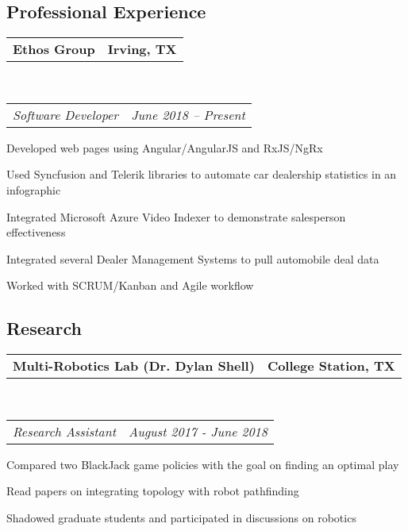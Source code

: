 \documentclass[10pt,letterpaper]{article}
\makeatletter
\newenvironment{indentsection}[1]%
{\begin{list}{}%
	{\setlength{\leftmargin}{#1}}%
	\item[]%
}
{\end{list}}
\newcommand{\headerrow}[2]
{\begin{tabular*}{\linewidth}{l@{\extracolsep{\fill}}r}
	#1 &
	#2 \\
\end{tabular*}}
\makeatother
\begin{document}
\subsection*{Professional Experience}
\begin{indentsection}{\parindent}
	\vspace{-0.4em}
	\headerrow
		{\textbf{Ethos Group}}
		{\textbf{Irving, TX}}
	\\
	\headerrow
		{\emph{Software Developer}}
		{\emph{June 2018 -- Present}}
	\begin{itemize*}
		\item Developed web pages using Angular/AngularJS and RxJS/NgRx
		\item Used Syncfusion and Telerik libraries to automate car dealership statistics in an infographic
		\item Integrated Microsoft Azure Video Indexer to demonstrate salesperson effectiveness 
		\item Integrated several Dealer Management Systems to pull automobile deal data
		\item Worked with SCRUM/Kanban and Agile workflow
	\end{itemize*}
\end{indentsection}

\vspace{-1.8em}
\subsection*{Research}
\begin{indentsection}{\parindent}
	\vspace{-0.4em}
	\headerrow
		{\textbf{Multi-Robotics Lab (Dr. Dylan Shell)}}
		{\textbf{College Station, TX}}
	\\
	\headerrow
		{\emph{Research Assistant}}
		{\emph{August 2017 - June 2018}}
	\begin{itemize*}
		\item Compared two BlackJack game policies with the goal on finding an optimal play 
		\item Read papers on integrating topology with robot pathfinding
		\item Shadowed graduate students and participated in discussions on robotics 
	\end{itemize*}
\end{indentsection}

\vspace{-1.8em}
\end{document}
